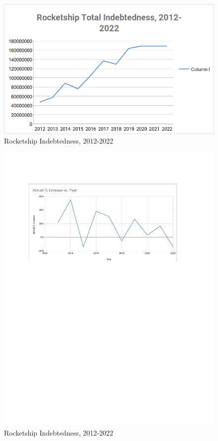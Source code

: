 \begin{figure}[t]
  \centering
  \includegraphics[width=\textwidth,keepaspectratio]{Debt}%
  \caption{Rocketship Indebtedness, 2012-2022}%
  \label{fig:total_debt}
\end{figure}

\begin{figure}[b]
  \centering
  \includegraphics[width=\textwidth,keepaspectratio]{Annual_Debt_Increases}%
  \caption{Rocketship Indebtedness, 2012-2022}%
  \label{fig:annual_debt_increases}
\end{figure}

